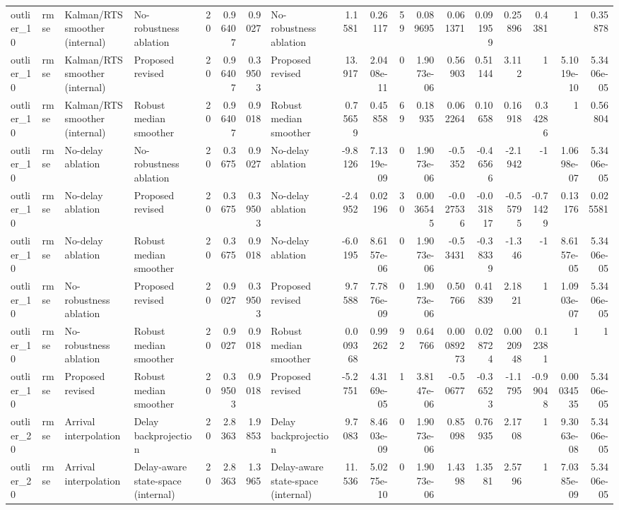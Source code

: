 \begin{table}[!htbp]
{\begin{tabular}{llllrrrlrrrrrrrrrr}
outlier_10 & rmse & Kalman/RTS smoother (internal) & No-robustness ablation & 20 & 0.96407 & 0.9027 & No-robustness ablation & 1.1581 & 0.26117 & 59 & 0.089695 & 0.061371 & 0.091959 & 0.25896 & 0.4381 & 1 & 0.35878 \\
outlier_10 & rmse & Kalman/RTS smoother (internal) & Proposed revised & 20 & 0.96407 & 0.39503 & Proposed revised & 13.917 & 2.0408e-11 & 0 & 1.9073e-06 & 0.56903 & 0.51144 & 3.112 & 1 & 5.1019e-10 & 5.3406e-05 \\
outlier_10 & rmse & Kalman/RTS smoother (internal) & Robust median smoother & 20 & 0.96407 & 0.9018 & Robust median smoother & 0.75659 & 0.45858 & 69 & 0.18935 & 0.062264 & 0.10658 & 0.16918 & 0.34286 & 1 & 0.56804 \\
outlier_10 & rmse & No-delay ablation & No-robustness ablation & 20 & 0.3675 & 0.9027 & No-delay ablation & -9.8126 & 7.1319e-09 & 0 & 1.9073e-06 & -0.5352 & -0.46566 & -2.1942 & -1 & 1.0698e-07 & 5.3406e-05 \\
outlier_10 & rmse & No-delay ablation & Proposed revised & 20 & 0.3675 & 0.39503 & No-delay ablation & -2.4952 & 0.02196 & 30 & 0.0036545 & -0.027536 & -0.031817 & -0.55795 & -0.71429 & 0.13176 & 0.025581 \\
outlier_10 & rmse & No-delay ablation & Robust median smoother & 20 & 0.3675 & 0.9018 & No-delay ablation & -6.0195 & 8.6157e-06 & 0 & 1.9073e-06 & -0.53431 & -0.38339 & -1.346 & -1 & 8.6157e-05 & 5.3406e-05 \\
outlier_10 & rmse & No-robustness ablation & Proposed revised & 20 & 0.9027 & 0.39503 & Proposed revised & 9.7588 & 7.7876e-09 & 0 & 1.9073e-06 & 0.50766 & 0.41839 & 2.1821 & 1 & 1.0903e-07 & 5.3406e-05 \\
outlier_10 & rmse & No-robustness ablation & Robust median smoother & 20 & 0.9027 & 0.9018 & Robust median smoother & 0.009368 & 0.99262 & 92 & 0.64766 & 0.00089273 & 0.028724 & 0.0020948 & 0.12381 & 1 & 1 \\
outlier_10 & rmse & Proposed revised & Robust median smoother & 20 & 0.39503 & 0.9018 & Proposed revised & -5.2751 & 4.3169e-05 & 1 & 3.8147e-06 & -0.50677 & -0.36523 & -1.1795 & -0.99048 & 0.00034535 & 5.3406e-05 \\
outlier_20 & rmse & Arrival interpolation & Delay backprojection & 20 & 2.8363 & 1.9853 & Delay backprojection & 9.7083 & 8.4603e-09 & 0 & 1.9073e-06 & 0.85098 & 0.76935 & 2.1708 & 1 & 9.3063e-08 & 5.3406e-05 \\
outlier_20 & rmse & Arrival interpolation & Delay-aware state-space (internal) & 20 & 2.8363 & 1.3965 & Delay-aware state-space (internal) & 11.536 & 5.0275e-10 & 0 & 1.9073e-06 & 1.4398 & 1.3581 & 2.5796 & 1 & 7.0385e-09 & 5.3406e-05 \\

\end{tabular}}
\end{table}
